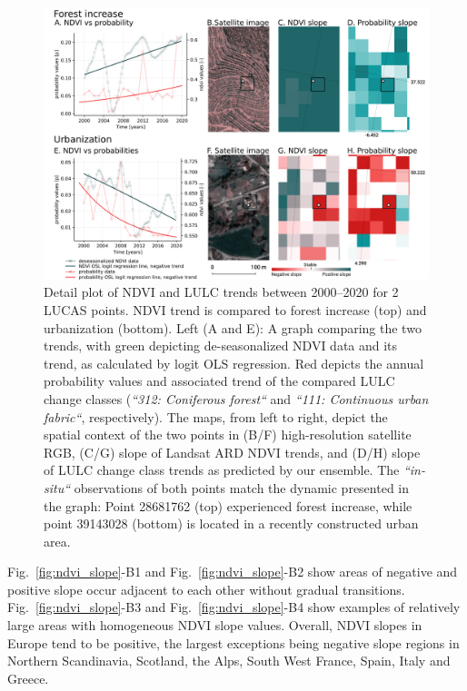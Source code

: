     
    \begin{figure}[hbt]
    \centering
    \includegraphics[width=\textwidth]{figs_03/results_ndvi_detail_plot.png}
    \caption{Detail plot of NDVI and LULC trends between 2000--2020 for 2 LUCAS points. NDVI trend is compared to forest increase (top) and urbanization (bottom). Left (A and E): A graph comparing the two trends, with green depicting de-seasonalized NDVI data and its trend, as calculated by logit OLS regression. Red depicts the annual probability values and associated trend of the compared LULC change classes (\emph{``312: Coniferous forest``} and \emph{``111: Continuous urban fabric``}, respectively). The maps, from left to right, depict the spatial context of the two points in (B/F) high-resolution satellite RGB, (C/G) slope of Landsat ARD NDVI trends, and (D/H) slope of LULC change class trends as predicted by our ensemble. The \emph{``in-situ``} observations of both points match the dynamic presented in the graph: Point 28681762 (top) experienced forest increase, while point 39143028 (bottom) is located in a recently constructed urban area.}

    \label{fig:ndvi_detail}
    \end{figure}
    
    Fig.\@~\ref{fig:ndvi_slope}-B1 and Fig.\@~\ref{fig:ndvi_slope}-B2 show areas of negative and positive slope occur adjacent to each other without gradual transitions. 
    Fig.\@~\ref{fig:ndvi_slope}-B3 and Fig.\@~\ref{fig:ndvi_slope}-B4 show examples of relatively large areas with homogeneous NDVI slope values. Overall, NDVI slopes in Europe tend to be positive, the largest exceptions being negative slope regions in Northern Scandinavia, Scotland, the Alps, South West France, Spain, Italy and Greece.
    

